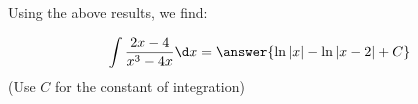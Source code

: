 \documentclass{ximera}
\begin{document}
\begin{exercise}
\begin{exercise}
\begin{exercise}
\begin{exercise}
\begin{exercise}
\begin{exercise}
Using the above results, we find:

 \[
\int \frac{2x-4}{x^3-4x} \d x = \answer{\ln|x|-\ln|x-2|+C}
\]
(Use $C$ for the constant of integration)


\end{exercise}
\end{exercise}
\end{exercise}
\end{exercise}
\end{exercise}
\end{exercise}
\end{document}

